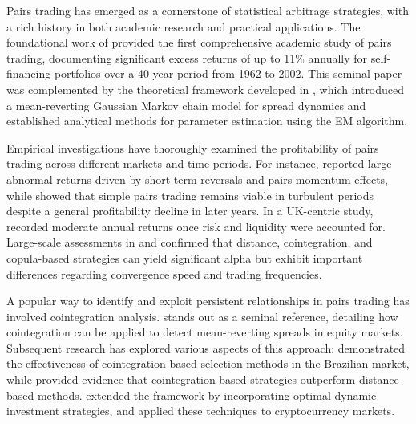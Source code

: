 Pairs trading has emerged as a cornerstone of statistical arbitrage strategies, with a rich history in both academic research and practical applications. The foundational work of \cite{Gatev2006} provided the first comprehensive academic study of pairs trading, documenting significant excess returns of up to 11\% annually for self-financing portfolios over a 40-year period from 1962 to 2002. This seminal paper was complemented by the theoretical framework developed in \cite{Elliott2005}, which introduced a mean-reverting Gaussian Markov chain model for spread dynamics and established analytical methods for parameter estimation using the EM algorithm.

Empirical investigations have thoroughly examined the profitability of pairs trading across different markets and time periods. For instance, \cite{Chen2019} reported large abnormal returns driven by short-term reversals and pairs momentum effects, while \cite{Do2010} showed that simple pairs trading remains viable in turbulent periods despite a general profitability decline in later years. In a UK-centric study, \cite{Bowen2014} recorded moderate annual returns once risk and liquidity were accounted for. Large-scale assessments in \cite{Krauss2016} and \cite{Rad2016} confirmed that distance, cointegration, and copula-based strategies can yield significant alpha but exhibit important differences regarding convergence speed and trading frequencies.

A popular way to identify and exploit persistent relationships in pairs trading has involved cointegration analysis. \cite{vidyamurthy2004pairs} stands out as a seminal reference, detailing how cointegration can be applied to detect mean-reverting spreads in equity markets. 
Subsequent research has explored various aspects of this approach: \cite{Caldeira2013} demonstrated the effectiveness of cointegration-based selection methods in the Brazilian market, while \cite{Huck2014} provided evidence that cointegration-based strategies outperform distance-based methods. \cite{Cartea2015} extended the framework by incorporating optimal dynamic investment strategies, and \cite{Lintilhac2016} applied these techniques to cryptocurrency markets.

